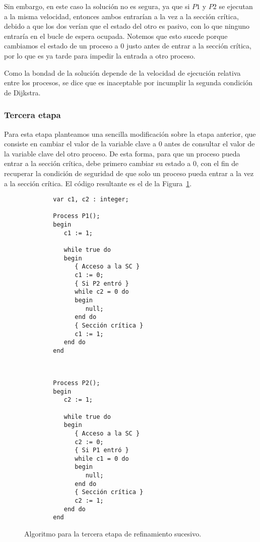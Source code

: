 Sin embargo, en este caso la solución no es segura, ya que si $P1$ y $P2$ se ejecutan a la misma velocidad, entonces ambos entrarían a la vez a la sección crítica, debido a que los dos verían que el estado del otro es pasivo, con lo que ninguno entraría en el bucle de espera ocupada. Notemos que esto sucede porque cambiamos el estado de un proceso a 0 justo antes de entrar a la sección crítica, por lo que es ya tarde para impedir la entrada a otro proceso.

Como la bondad de la solución depende de la velocidad de ejecución relativa entre los procesos, se dice que es inaceptable por incumplir la segunda condición de Dijkstra.

\subsubsection{Tercera etapa}
Para esta etapa planteamos una sencilla modificación sobre la etapa anterior, que consiste en cambiar el valor de la variable clave a 0 antes de consultar el valor de la variable clave del otro proceso. De esta forma, para que un proceso pueda entrar a la sección crítica, debe primero cambiar su estado a 0, con el fin de recuperar la condición de seguridad de que solo un proceso pueda entrar a la vez a la sección crítica. El código resultante es el de la Figura~\ref{fig:cod_tercera_etapa}.\\
\begin{figure}
\setlength{\columnsep}{1cm}
\begin{multicols}{2}
    \begin{verbatim}
        var c1, c2 : integer;
    
        Process P1();
        begin
           c1 := 1;
    
           while true do
           begin
              { Acceso a la SC }
              c1 := 0;
              { Si P2 entró }
              while c2 = 0 do
              begin
                 null;
              end do
              { Sección crítica }
              c1 := 1;
           end do
        end
    \end{verbatim}
    \begin{verbatim}

    
        Process P2();
        begin
           c2 := 1;
    
           while true do
           begin
              { Acceso a la SC }
              c2 := 0;
              { Si P1 entró }
              while c1 = 0 do
              begin
                 null;
              end do
              { Sección crítica }
              c2 := 1;
           end do
        end
    \end{verbatim}
\end{multicols}
\caption{Algoritmo para la tercera etapa de refinamiento sucesivo.}
\label{fig:cod_tercera_etapa}
\end{figure}
